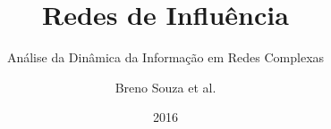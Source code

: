 \title{Redes de Influência}
\subtitle{Análise da Dinâmica da Informação em Redes Complexas}


\author{Breno Souza et al.}

\date{2016}

